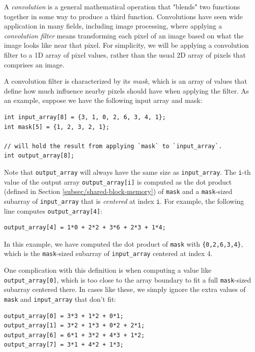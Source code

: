 \documentclass{article}
\theoremstyle{definition}
\begin{document}
A \emph{convolution} is a general mathematical operation that "blends" two functions together in some way to produce a third function. Convolutions have seen wide application in many fields, including image processing, where applying a  \emph{convolution filter} means transforming each pixel of an image based on what the image looks like near that pixel. For simplicity, we will be applying a convolution filter to a 1D array of pixel values, rather than the usual 2D array of pixels that comprises an image.

A convolution filter is characterized by its \emph{mask}, which is an array of values that define how much influence nearby pixels should have when applying the filter. As an example, suppose we have the following input array and mask:

\begin{verbatim}
int input_array[8] = {3, 1, 0, 2, 6, 3, 4, 1};
int mask[5] = {1, 2, 3, 2, 1};

// will hold the result from applying `mask` to `input_array`.
int output_array[8]; 
\end{verbatim}

Note that \texttt{output\_array} will always have the same size as \texttt{input\_array}. The \texttt{i}-th value of the output array \texttt{output\_array[i]} is computed as the dot product (defined in Section \ref{subsec/shared-block-memory}) of \texttt{mask} and a \texttt{mask}-sized subarray of \texttt{input\_array} that is \emph{centered} at index \texttt{i}. For example, the following line computes \texttt{output\_array[4]}:

\begin{verbatim}
output_array[4] = 1*0 + 2*2 + 3*6 + 2*3 + 1*4;
\end{verbatim}

In this example, we have computed the dot product of \texttt{mask} with \texttt{\{0,2,6,3,4\}}, which is the \texttt{mask}-sized subarray of \texttt{input\_array} centered at index 4.

One complication with this definition is when computing a value  like \texttt{output\_array[0]}, which is too close to the array boundary to fit a full \texttt{mask}-sized subarray centered there. In cases like these, we simply ignore the extra values of \texttt{mask} and \texttt{input\_array} that don't fit:

\begin{verbatim}
output_array[0] = 3*3 + 1*2 + 0*1;
output_array[1] = 3*2 + 1*3 + 0*2 + 2*1;
output_array[6] = 6*1 + 3*2 + 4*3 + 1*2;
output_array[7] = 3*1 + 4*2 + 1*3;
\end{verbatim}
\end{document}
